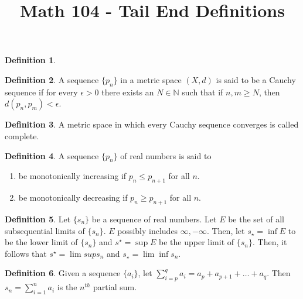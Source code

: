 \documentclass[12pt]{article}
\theoremstyle{definition}
\newtheorem{definition}{Definition}
\theoremstyle{named}
\begin{document}
\title{Math 104 - Tail End Definitions}
\author{}
\date{}
\maketitle
\date

\renewcommand{\thedefinition}{6.1}
\begin{definition}
    
\end{definition}


\renewcommand{\thedefinition}{6.1}
\begin{definition}
A sequence $\{p_n\}$ in a metric space $(X,d)$ is said to be a Cauchy sequence if for every $\epsilon > 0$ there exists an $N \in \mathbb{N}$ such that if $n,m \geq N$, then $d(p_n,p_m) < \epsilon$. 
\end{definition}


\renewcommand{\thedefinition}{6.1}
\begin{definition}
    A metric space in which every Cauchy sequence converges is called complete.
\end{definition}


\renewcommand{\thedefinition}{6.1}
\begin{definition}
    A sequence $\{p_n\}$ of real numbers is said to 
    \begin{enumerate}
        \item be monotonically increasing if $p_n \leq p_{n+1}$ for all $n$.
        \item be monotonically decreasing if $p_n \geq p_{n+1}$ for all $n$. 
    \end{enumerate}
\end{definition}


\renewcommand{\thedefinition}{6.1}
\begin{definition}
    Let $\{s_n\}$ be a sequence of real numbers. Let $E$ be the set of all subsequential limits of $\{s_n\}$. $E$ possibly includes $\infty, -\infty$. Then, let $s_\star = \inf E$ to be the lower limit of $\{s_n\}$ and $s^\star = \sup E$ be the upper limit of $\{s_n\}$. Then, it follows that $s^\star = \lim sup s_n$ and $s_\star = \lim \inf s_n$. 
\end{definition}


\renewcommand{\thedefinition}{6.1}
\begin{definition}
    Given a sequence $\{a_i\}$, let $\sum_{i=p}^{q} a_i = a_p + a_{p+1} + \dots + a_q$. Then $s_n = \sum_{i=1}^{n} a_i$ is the $n^{th}$ partial sum. 
\end{definition}
\end{document}

